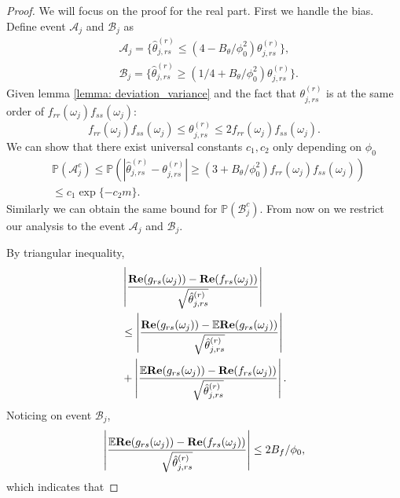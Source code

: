 \begin{proof}
We will focus on the proof for the real part. First we handle the bias. 
Define event $\mathcal{A}_j$ and $\mathcal{B}_j$ as 
\begin{equation}
\begin{aligned}
& \mathcal{A}_j = \{\hat{\theta}^{(r)}_{j, rs}\le (4 - B_\theta/\phi_0^2) \theta^{(r)}_{j,rs} \},\\
& \mathcal{B}_j = \{\hat{\theta}^{(r)}_{j, rs}\ge (1/4 + B_\theta/\phi_0^2) \theta^{(r)}_{j, rs} \}.
\end{aligned}
\end{equation}
Given lemma \ref{lemma: deviation_variance} and the fact that $\theta^{(r)}_{j, rs}$ is at the same order of $f_{rr}(\omega_j)f_{ss}(\omega_j)$:
\begin{equation}
f_{rr}(\omega_j)f_{ss}(\omega_j)\le \theta^{(r)}_{j, rs}\le  2f_{rr}(\omega_j)f_{ss}(\omega_j). 
\end{equation}
We can show that there exist universal constants $c_1, c_2$ only depending on $\phi_0$
\begin{equation}
\begin{aligned}
&\mathbb{P} (\mathcal{A}_j^c) \le \mathbb{P}\left(|\hat{\theta}^{(r)}_{j, rs} - \theta^{(r)}_{j, rs}|\ge (3 +B_\theta/\phi_0^2 )f_{rr}(\omega_j)f_{ss}(\omega_j)\right)\\
& \le c_1\exp\{-c_2m\}.
\end{aligned}
\end{equation}
Similarly we can obtain the same bound for $\mathbb{P}(\mathcal{B}_j^c)$. From now on we restrict our analysis to the event $\mathcal{A}_j$ and $\mathcal{B}_j$. \par 
By triangular inequality,  
\begin{equation}
\begin{aligned}
& \left|\frac{{\bf Re}(g_{rs}(\omega_j)) - {\bf Re}(f_{rs}(\omega_j))}{\sqrt{\hat{\theta}^{(r)}_{j,rs}}}\right| \\
& \le \left|\frac{{\bf Re}(g_{rs}(\omega_j)) - \mathbb{E} {\bf Re}(g_{rs}(\omega_j))}{\sqrt{\hat{\theta}^{(r)}_{j,rs}}}\right|\\
& +  \left|\frac{\mathbb{E} {\bf Re}(g_{rs}(\omega_j)) -{\bf Re}(f_{rs}(\omega_j))}{\sqrt{\hat{\theta}^{(r)}_{j,rs}}}\right|. 
\end{aligned}
\end{equation}
Noticing on event $\mathcal{B}_j$, 
\begin{equation}
 \left|\frac{\mathbb{E} {\bf Re}(g_{rs}(\omega_j)) -{\bf Re}(f_{rs}(\omega_j))}{\sqrt{\hat{\theta}^{(r)}_{j,rs}}}\right|\le 2B_f/\phi_0,
\end{equation}
which indicates that 


\end{proof}
